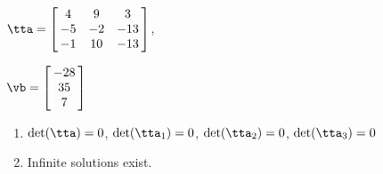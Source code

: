 {$\tta = \left[\hskip -3pt \begin{array}{ccc} 4&9&3\\  -5&-2&-13
\\  -1&10&-13\end{array}\hskip -3pt \right] $,

$\vb = \left[\hskip -3pt \begin{array}{c} -28\\  35
\\  7\end{array}\hskip -3pt \right]$}
{\begin{enumerate}
\item	$\det(\tta) = 0$, $\det(\tta_1) = 0$, $\det(\tta_2) = 0$, $\det(\tta_3) = 0$
\item Infinite solutions exist.
\end{enumerate}
}

 


